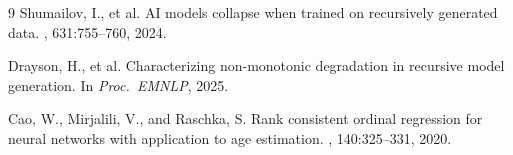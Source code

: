 \documentclass[11pt,a4paper]{article}
\begin{document}
\begin{thebibliography}{9}
Shumailov, I., et al.
\newblock AI models collapse when trained on recursively generated data.
, 631:755--760, 2024.

Drayson, H., et al.
\newblock Characterizing non-monotonic degradation in recursive model generation.
\newblock In {\em Proc.\ EMNLP}, 2025.

Cao, W., Mirjalili, V., and Raschka, S.
\newblock Rank consistent ordinal regression for neural networks with application to age estimation.
, 140:325--331, 2020.
\end{thebibliography}
\end{document}
